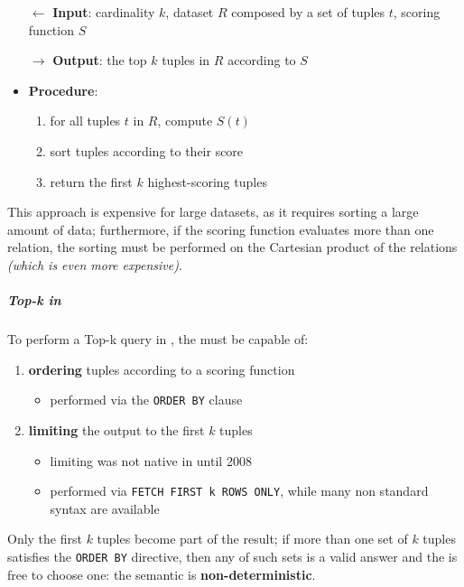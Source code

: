 \documentclass[english]{article}
\begin{document}
\begin{itemize}
  \item[\(\leftarrow\)] \textbf{Input}: cardinality \(k\), dataset \(R\) composed by a set of tuples \(t\), scoring function \(S\)
  \item[\(\rightarrow\)] \textbf{Output}: the top \(k\) tuples in \(R\) according to \(S\)
  \item \textbf{Procedure}:
        \begin{enumerate}[label=step \arabic*., ref=step (\arabic*), widest*=7, leftmargin=*, labelindent=1em]
          \item for all tuples \(t\) in \(R\), compute \(S(t)\)
          \item sort tuples according to their score
          \item return the first \(k\) highest-scoring tuples
        \end{enumerate}
\end{itemize}

This approach is expensive for large datasets, as it requires sorting a large amount of data;
furthermore, if the scoring function evaluates more than one relation, the sorting must be performed on the Cartesian product of the relations \textit{(which is even more expensive)}.

\subparagraph*{Top-k in \sql}
To perform a Top-k query in \sql, the \dbms must be capable of:

\begin{enumerate}
  \item \textbf{ordering} tuples according to a scoring function
        \begin{itemize}
          \item performed via the \texttt{ORDER BY} clause
        \end{itemize}
  \item \textbf{limiting} the output to the first \(k\) tuples
        \begin{itemize}
          \item limiting was not native in \sql until 2008
          \item performed via \texttt{FETCH FIRST k ROWS ONLY}, while many non standard syntax are available
        \end{itemize}
\end{enumerate}

Only the first \(k\) tuples become part of the result;
if more than one set of \(k\) tuples satisfies the \texttt{ORDER BY} directive, then any of such sets is a valid answer and the \dbms is free to choose one: the semantic is \textbf{non-deterministic}.
\end{document}
